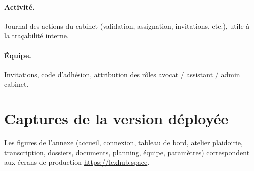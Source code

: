\paragraph{Activité.}
Journal des actions du cabinet (validation, assignation, invitations, etc.), utile à la traçabilité interne.

\paragraph{Équipe.}
Invitations, code d'adhésion, attribution des rôles avocat / assistant / admin cabinet.

\section{Captures de la version déployée}

Les figures de l'annexe (accueil, connexion, tableau de bord, atelier plaidoirie, transcription, dossiers, documents, planning, équipe, paramètres) correspondent aux écrans de production \url{https://lexhub.space}.
